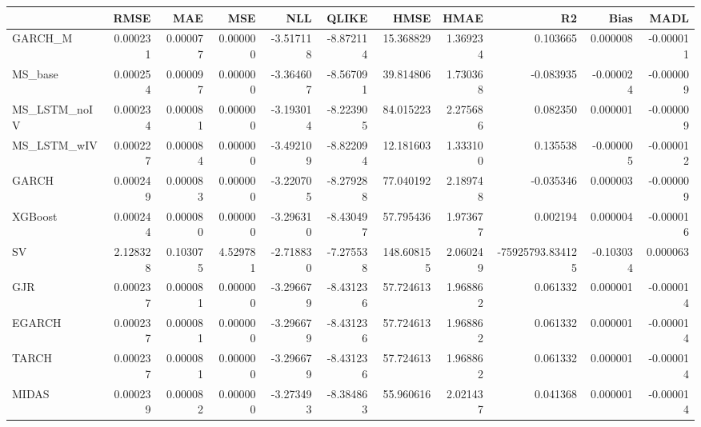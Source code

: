 \begin{tabular}{lrrrrrrrrrr}
\toprule
 & RMSE & MAE & MSE & NLL & QLIKE & HMSE & HMAE & R2 & Bias & MADL \\
\midrule
GARCH_M & 0.000231 & 0.000077 & 0.000000 & -3.517118 & -8.872114 & 15.368829 & 1.369234 & 0.103665 & 0.000008 & -0.000011 \\
MS_base & 0.000254 & 0.000097 & 0.000000 & -3.364607 & -8.567091 & 39.814806 & 1.730368 & -0.083935 & -0.000024 & -0.000009 \\
MS_LSTM_noIV & 0.000234 & 0.000081 & 0.000000 & -3.193014 & -8.223905 & 84.015223 & 2.275686 & 0.082350 & 0.000001 & -0.000009 \\
MS_LSTM_wIV & 0.000227 & 0.000084 & 0.000000 & -3.492109 & -8.822094 & 12.181603 & 1.333100 & 0.135538 & -0.000005 & -0.000012 \\
GARCH & 0.000249 & 0.000083 & 0.000000 & -3.220705 & -8.279288 & 77.040192 & 2.189748 & -0.035346 & 0.000003 & -0.000009 \\
XGBoost & 0.000244 & 0.000080 & 0.000000 & -3.296310 & -8.430497 & 57.795436 & 1.973677 & 0.002194 & 0.000004 & -0.000016 \\
SV & 2.128328 & 0.103075 & 4.529781 & -2.718830 & -7.275538 & 148.608155 & 2.060249 & -75925793.834125 & -0.103034 & 0.000063 \\
GJR & 0.000237 & 0.000081 & 0.000000 & -3.296679 & -8.431236 & 57.724613 & 1.968862 & 0.061332 & 0.000001 & -0.000014 \\
EGARCH & 0.000237 & 0.000081 & 0.000000 & -3.296679 & -8.431236 & 57.724613 & 1.968862 & 0.061332 & 0.000001 & -0.000014 \\
TARCH & 0.000237 & 0.000081 & 0.000000 & -3.296679 & -8.431236 & 57.724613 & 1.968862 & 0.061332 & 0.000001 & -0.000014 \\
MIDAS & 0.000239 & 0.000082 & 0.000000 & -3.273493 & -8.384863 & 55.960616 & 2.021437 & 0.041368 & 0.000001 & -0.000014 \\
\bottomrule
\end{tabular}

